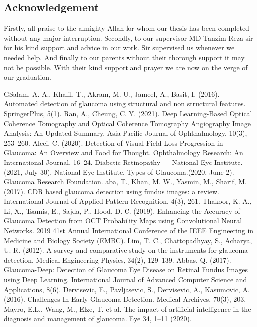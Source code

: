 \documentclass[conference]{IEEEtran}
\begin{document}
\subsection{Acknowledgement }

Firstly, all praise to the almighty Allah for whom our thesis has been completed without any major interruption. Secondly, to our supervisor MD Tanzim Reza sir for his kind support and advice in our work. Sir supervised us whenever we needed help. And finally to our parents without their thorough support it may not be possible. With their kind support and prayer we are now on the verge of our graduation.

\begin{thebibliography}{00}
 GSalam, A. A., Khalil, T., Akram, M. U., Jameel, A., Basit, I. (2016). Automated detection of glaucoma using structural and non structural features. SpringerPlus, 5(1).
 Ran, A., Cheung, C. Y. (2021). Deep Learning-Based Optical Coherence Tomography and Optical Coherence Tomography Angiography Image Analysis: An Updated Summary. Asia-Pacific Journal of Ophthalmology, 10(3), 253–260.
 Aleci, C. (2020). Detection of Visual Field Loss Progression in Glaucoma: An Overview and Food for Thought. Ophthalmology Research: An International Journal, 16–24.
 Diabetic Retinopathy — National Eye Institute. (2021, July 30). National Eye Institute.
 Types of Glaucoma.(2020, June 2). Glaucoma Research Foundation. 
 aba, T., Khan, M. W., Yasmin, M., Sharif, M. (2017). CDR based glaucoma detection using fundus images: a review. International Journal of Applied Pattern Recognition, 4(3), 261.
 Thakoor, K. A., Li, X., Tsamis, E., Sajda, P., Hood, D. C. (2019). Enhancing the Accuracy of Glaucoma Detection from OCT Probability Maps using Convolutional Neural Networks. 2019 41st Annual International Conference of the IEEE Engineering in Medicine and Biology Society (EMBC).
 Lim, T. C., Chattopadhyay, S., Acharya, U. R. (2012). A survey and comparative study on the instruments for glaucoma detection. Medical Engineering Physics, 34(2), 129–139.
 Abbas, Q. (2017). Glaucoma-Deep: Detection of Glaucoma Eye Disease on Retinal Fundus Images using Deep Learning. International Journal of Advanced Computer Science and Applications, 8(6).
 Dervisevic, E., Pavljasevic, S., Dervisevic, A., Kasumovic, A. (2016). Challenges In Early Glaucoma Detection. Medical Archives, 70(3), 203. 
 Mayro, E.L., Wang, M., Elze, T. et al. The impact of artificial intelligence in the diagnosis and management of glaucoma. Eye 34, 1–11 (2020). 

\end{thebibliography}
\end{document}
